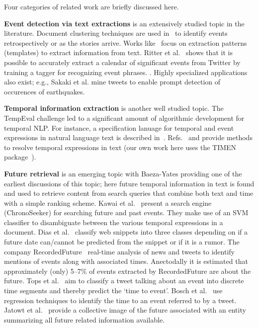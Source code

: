 Four categories of related work 
are briefly discussed here.

{\bf Event detection via text extractions}
is an extensively studied topic in the literature. Document clustering techniques are used 
in~\cite{Allan:2002:TDT, Yang:1998:SRO, Gabrilovich:2004:NPP} to identify events retrospectively or as the stories arrive.
Works like~\cite{Chambers:2011:TIE, Banko07openinformation, riloff2003learning} focus on
extraction patterns (templates) to extract information from text. Ritter et al.~\cite{Ritter:2012} shows that
it is possible to accurately extract a calendar of significant events from Twitter by training a tagger for recognizing event phrases.
\iffalse 
Sankaranarayanan et al.\cite{Sankaranarayanan:2009:TNT} captures tweet clusters of interest to identify late breaking News from twitter 
\fi.
Highly specialized applications
also exist; e.g., Sakaki et al.\cite{Sakaki:2010:EST} mine tweets to enable prompt detection of occurences of earthquakes.

{\bf Temporal information extraction} is another well studied topic.
The TempEval challenge\cite{tempeval} led to a significant amount of
algorithmic development for temporal NLP.
For instance, a specification lanuage
for temporal and event expressions in natural language text is described in~\cite{timeml}.
Refs.~\cite{LlorensDGS12} and \cite{tempex} provide methods to resolve temporal expressions in text (our own
work here uses the TIMEN package~\cite{LlorensDGS12}).

{\bf Future retrieval} is an emerging topic with 
Baeza-Yates\cite{baeza2005searching} providing one of the earliest discussions
of this topic; here future temporal information in text is found and used to retrieve content from search queries that 
combine both text and time with a simple ranking scheme. Kawai et al.~\cite{Kawai:2010:CSE} present a search engine (ChronoSeeker) for searching 
future and past events.
They make use of an SVM classifier to disambiguate between the various temporal expressions in a document.
Dias et al.~\cite{dias2011future} classify web snippets into three classes depending on if a future date can/cannot be predicted 
from the snippet or if it is a rumor.
The company 
RecordedFuture~\cite{recordedFuture} real-time analysis of news and tweets to identify mentions of events along with associated times. Anectodally it is estimated that approximately (only) 5--7\% of events extracted 
by RecordedFuture are about the future.
Tops et al.~\cite{tops2013predicting} aim to classify a tweet talking about an event into discrete time segments and thereby predict the 
`time to event'.
Bosch et al.~\cite{bosch2013estm} use regression techniques to identify the time to an event referred to by a tweet.
Jatowt et al.~\cite{Jatowt:2011:ECE} provide a collective image of the future associated with an entity summarizing all future related information available.

